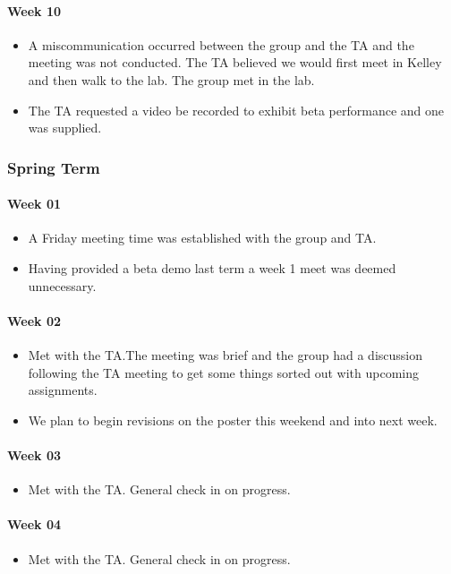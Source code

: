 \paragraph{Week 10}
\begin{itemize}
\item A miscommunication occurred between the group and the TA and the meeting was not conducted. The TA believed we would first meet in Kelley and then walk to the lab. The group met in the lab.
\item The TA requested a video be recorded to exhibit beta performance and one was supplied.
\end{itemize}

\subsubsection{Spring Term}
\paragraph{Week 01}
\begin{itemize}
\item A Friday meeting time was established with the group and TA.
\item Having provided a beta demo last term a week 1 meet was deemed unnecessary.
\end{itemize}
\paragraph{Week 02}
\begin{itemize}
\item Met with the TA.The meeting was brief and the group had a discussion following the TA meeting to get some things sorted out with upcoming assignments.
\item We plan to begin revisions on the poster this weekend and into next week.
\end{itemize}
\paragraph{Week 03}
\begin{itemize}
\item Met with the TA. General check in on progress.
\end{itemize}
\paragraph{Week 04}
\begin{itemize}
\item Met with the TA. General check in on progress.
\end{itemize}

